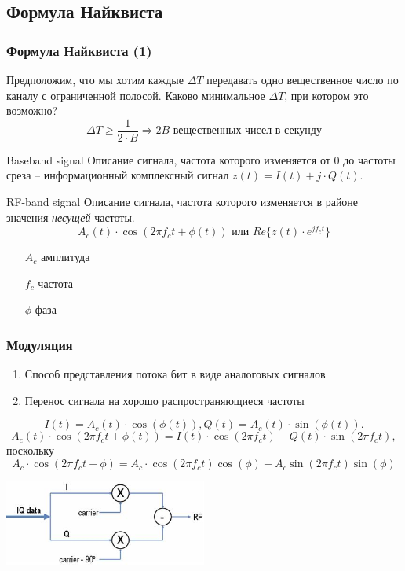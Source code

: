 \documentclass[utf8]{beamer}
\begin{document}
\subsection{Формула Найквиста}
\begin{frame}
\frametitle{Формула Найквиста (1)}
Предположим, что мы хотим каждые $\Delta T$ передавать одно вещественное число по каналу с ограниченной полосой. Каково минимальное $\Delta T$, при котором это возможно?
\pause
$$
\Delta T \geq \frac{1}{2\cdot B} \Rightarrow 2B \textrm{ вещественных чисел в секунду}
$$
\end{frame}
\begin{frame}
\begin{block}{Baseband signal}
Описание сигнала, частота которого изменяется от 0 до частоты среза -- информационный комплексный сигнал $z(t) = I(t) + j\cdot Q(t)$.
\end{block}
\begin{block}{RF-band signal}
Описание сигнала, частота которого изменяется в районе значения \emph{несущей} частоты.
$$
A_c(t) \cdot \cos (2\pi f_ct + \phi(t)) \textrm{ или } Re\{z(t)\cdot e^{jf_ct}\}
$$
\begin{itemize}
 \item [$A_c$] амплитуда
 \item [$f_c$] частота
 \item [$\phi$] фаза
\end{itemize}
\end{block}
\end{frame}
\begin{frame}
\frametitle{Модуляция}
\begin{enumerate}
 \item Способ представления потока бит в виде аналоговых сигналов
 \item Перенос сигнала на хорошо распространяющиеся частоты
\end{enumerate}
$$
I(t) = A_c(t)\cdot \cos(\phi(t)), Q(t) = A_c(t)\cdot \sin(\phi(t)).
$$
$$
A_c(t) \cdot \cos (2\pi f_ct + \phi(t)) = I(t)\cdot \cos (2\pi f_ct) - Q(t)\cdot \sin (2\pi f_ct),
$$
поскольку
$$
A_c \cdot \cos (2\pi f_ct + \phi) = A_c\cdot \cos (2\pi f_ct) \cos (\phi) - A_c\sin(2\pi f_ct)\sin(\phi)
$$
\begin{center}
\includegraphics[width=0.5\textwidth]{pic/dhall_2_modulator.png}
\end{center}
\end{frame}
\end{document}
